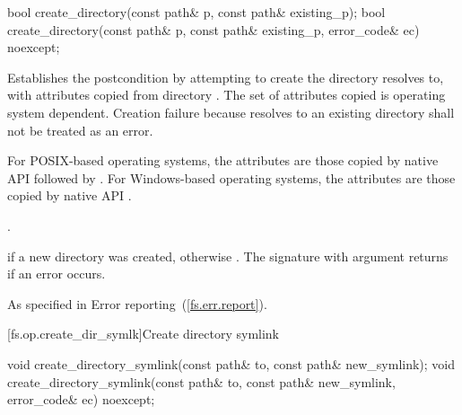 \begin{itemdecl}
bool create_directory(const path& p, const path& existing_p);
bool create_directory(const path& p, const path& existing_p, error_code& ec) noexcept;
\end{itemdecl}

\begin{itemdescr}
\pnum
\effects Establishes the postcondition by attempting to create the
  directory  resolves to, with
  attributes copied from directory . The set of attributes
  copied is operating system dependent. Creation failure because  resolves to an existing directory shall not be
  treated as an error.
\begin{note} For POSIX-based operating systems, the
      attributes are those copied by native API 
      followed by . For
      Windows-based operating systems, the attributes are those copied by native
      API .
\end{note}

\pnum
\postcondition {}.

\pnum
\returns {} if a new directory was created, otherwise .
  The signature with argument  returns  if an error occurs.

\pnum
\throws As specified in Error reporting~(\ref{fs.err.report}).
\end{itemdescr}


[fs.op.create_dir_symlk]{Create directory symlink}

\begin{itemdecl}
void create_directory_symlink(const path& to, const path& new_symlink);
void create_directory_symlink(const path& to, const path& new_symlink,
                              error_code& ec) noexcept;
\end{itemdecl}


